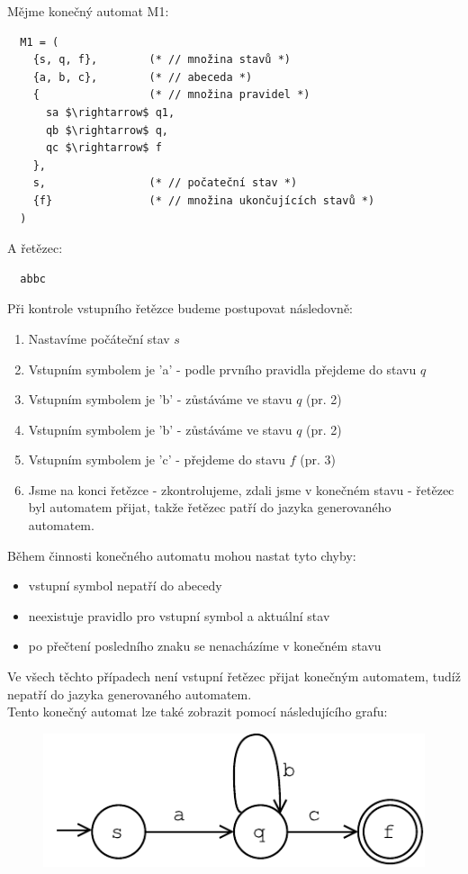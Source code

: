 \begin{exmp}
  Mějme konečný automat M1:
  \begin{lstlisting}
  M1 = (
    {s, q, f},        (* // množina stavů *)
    {a, b, c},        (* // abeceda *)
    {                 (* // množina pravidel *)
      sa $\rightarrow$ q1,
      qb $\rightarrow$ q,
      qc $\rightarrow$ f
    },
    s,                (* // počateční stav *)
    {f}               (* // množina ukončujících stavů *)
  )
  \end{lstlisting}
  A řetězec:
\begin{lstlisting}
  abbc
\end{lstlisting}

\noindent
Při kontrole vstupního řetězce budeme postupovat následovně:

\begin{enumerate}
  \item Nastavíme počáteční stav $s$
  \item Vstupním symbolem je 'a' - podle prvního pravidla přejdeme do stavu $q$
  \item Vstupním symbolem je 'b' - zůstáváme ve stavu $q$ (pr. 2)
  \item Vstupním symbolem je 'b' - zůstáváme ve stavu $q$ (pr. 2)
  \item Vstupním symbolem je 'c' - přejdeme do stavu $f$ (pr. 3)
  \item Jsme na konci řetězce - zkontrolujeme, zdali jsme v konečném stavu - řetězec byl automatem přijat,
  takže řetězec patří do jazyka generovaného automatem.
\end{enumerate}

\noindent
Během činnosti konečného automatu mohou nastat tyto chyby:

\begin{itemize}
  \item vstupní symbol nepatří do abecedy
  \item neexistuje pravidlo pro vstupní symbol a aktuální stav
  \item po přečtení posledního znaku se nenacházíme v konečném stavu
\end{itemize}
Ve všech těchto případech není vstupní řetězec přijat konečným automatem, tudíž nepatří
do jazyka generovaného automatem.\\

\noindent
Tento konečný automat lze také zobrazit pomocí následujícího grafu:

\begin{figure}[H]
  \centering
  \includegraphics{fig/finiteAutomat.pdf}
\end{figure}

\end{exmp}

